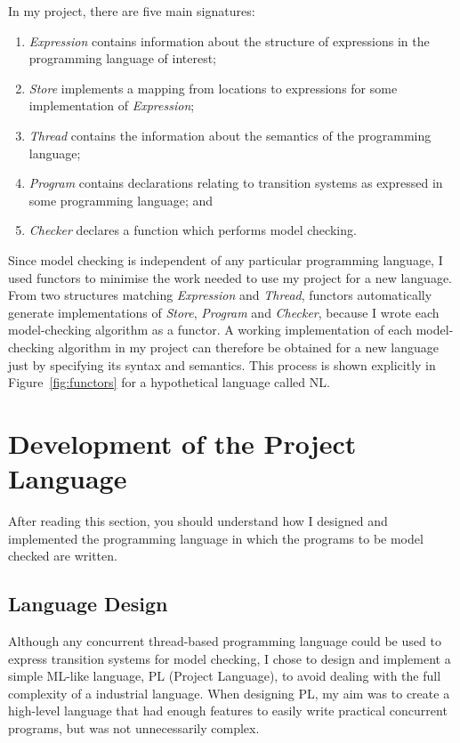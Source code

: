 \documentclass[12pt,a4paper,twoside,openright]{report}
\begin{document}
In my project, there are five main signatures:
\begin{enumerate}
	\item \emph{Expression}	contains information
	about the structure of expressions
	in the programming language of interest;
	\item \emph{Store} implements
	a mapping from locations
	to expressions for some
	implementation of \emph{Expression};
	\item \emph{Thread} contains the
	information about the semantics
	of the programming language;
	\item \emph{Program} contains declarations relating to
	transition systems as expressed in some programming
	language; and
	\item \emph{Checker} declares a function
	which performs model checking.
\end{enumerate}

Since model checking is independent of any
particular programming language, I used functors
to minimise the work needed to use my project
for a new language.
From two structures matching \emph{Expression} and \emph{Thread},
functors automatically generate implementations of
\emph{Store}, \emph{Program} and \emph{Checker},
because I wrote
each model-checking algorithm as a functor.
A working implementation of each model-checking
algorithm in my project can therefore be
obtained for a new language just by
specifying its syntax and semantics.
This process is shown explicitly in
Figure~\ref{fig:functors} for
a hypothetical language called NL.


\section{Development of the Project Language}
\label{sec:language}
After reading this section, you should
understand how I designed
and implemented the programming
language in which the programs to
be model checked are written.

\subsection{Language Design}
Although any concurrent
thread-based programming language
could be used to express transition systems for model
checking, I chose to design and implement a simple
ML-like language, PL (Project Language), to avoid
dealing with the full complexity of a
industrial language. When designing PL, my aim
was to create a high-level language that had enough features
to easily write practical concurrent programs,
but was not unnecessarily complex.
\end{document}
